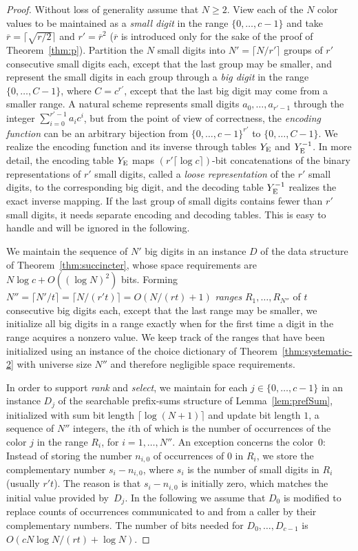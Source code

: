 \documentclass[envcountsame,envcountsect,undated,nolinenumbers]{lnthi}
\def\Tvn#1{\hbox{\textit{#1\/}}}
\def\Tceil#1{\lceil #1\rceil}
\def\rbar{\overline{r}}
\begin{document}
\begin{proof}
Without loss of generality assume that $N\ge 2$.
View each of the $N$ color values to be maintained
as a \emph{small digit} in the range $\{0,\ldots,c-1\}$
and take $\rbar=\Tceil{\sqrt{{r/2}}}$ and
$r'=\rbar^2$ ($\rbar$ is introduced only for
the sake of the proof of
Theorem~\ref{thm:p}).
Partition the $N$ small digits into
$N'=\Tceil{{N/{r'}}}$ groups of $r'$
consecutive small digits each, except that the
last group may be smaller, and represent the
small digits in each group through a \emph{big digit}
in the range $\{0,\ldots,C-1\}$,
where $C=c^{r'}$, except that the last big digit
may come from a smaller range.
A natural scheme represents small digits
$a_0,\ldots,a_{r'-1}$ through the integer
$\sum_{i=0}^{r'-1}a_i c^i$, but from the
point of view of correctness, the
\emph{encoding function} can be an arbitrary
bijection from $\{0,\ldots,c-1\}^{r'}$ to
$\{0,\ldots,C-1\}$.
We realize the encoding function and its
inverse through tables $Y_{\mbox{\scriptsize E}}$ and $Y^{-1}_{\mbox{\scriptsize E}}$.
In more detail, the encoding table $Y_{\mbox{\scriptsize E}}$ maps
$(r'\Tceil{\log c})$-bit concatenations of
the binary representations of $r'$ small digits,
called a \emph{loose representation}
of the $r'$ small digits,
to the corresponding big digit, and the
decoding table $Y^{-1}_{\mbox{\scriptsize E}}$ realizes the
exact inverse mapping.
If the last group of small digits contains fewer
than $r'$ small digits, it needs separate
encoding and decoding tables.
This is easy to handle and will be
ignored in the following.

We maintain the sequence of $N'$ big
digits in an instance $D$ of the data structure of
Theorem~\ref{thm:succincter},
whose space requirements are
$N\log c+O((\log N)^2)$ bits.
Forming $N''=\Tceil{{{N'}/t}}=\Tceil{N/{(r' t)}}=O({N/{(r t)}}+1)$
\emph{ranges} $R_1,\ldots,R_{N''}$
of ${t}$ consecutive big digits each,
except that the last range may be smaller,
we initialize all big digits in a range
exactly when for the first time a
digit in the range acquires a nonzero value.
We keep track of the ranges that have been initialized
using an instance of the choice dictionary
of Theorem~\ref{thm:systematic-2} with
universe size $N''$ and therefore
negligible space requirements.

In order to support \Tvn{rank} and \Tvn{select},
we maintain for each $j\in\{0,\ldots,c-1\}$
in an instance $D_j$  of the searchable prefix-sums structure
of Lemma~\ref{lem:prefSum}, initialized with
sum bit length
$\Tceil{\log(N+1)}$ and update bit length $1$, a sequence
of $N''$ integers, the $i$th of which is the
number of occurrences of the color $j$ in the range $R_i$,
for $i=1,\ldots,N''$.
An exception concerns the color~0:
Instead of storing the number $n_{i,0}$ of
occurrences of 0 in $R_i$,
we store the complementary number $s_i-n_{i,0}$,
where $s_i$ is the number of small digits
in $R_i$ (usually $r' t$).
The reason is that $s_i-n_{i,0}$ is initially zero,
which matches the initial value provided by~$D_j$.
In the following we assume that $D_0$ is
modified to replace counts of occurrences
communicated to and from a caller by their
complementary numbers.
The number of bits needed for $D_0,\ldots,D_{c-1}$
is $O({{c N\log N}/{(r t)}}+\log N)$.


\end{proof}
\end{document}
